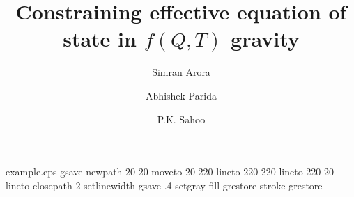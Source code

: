 %
%
%
%
%
\begin{filecontents*}{example.eps}
gsave
newpath
  20 20 moveto
  20 220 lineto
  220 220 lineto
  220 20 lineto
closepath
2 setlinewidth
gsave
  .4 setgray fill
grestore
stroke
grestore
\end{filecontents*}
%
\RequirePackage{fix-cm}
\documentclass[twocolumn,epjc3]{svjour3}  
%
\smartqed  %
%
\RequirePackage{graphicx}
\RequirePackage{float}
\RequirePackage{hyperref}
\RequirePackage{amsmath}
\usepackage{mwe}
\RequirePackage{amssymb}
\RequirePackage{mathtools}   
\usepackage{orcidlink}
\usepackage{booktabs}
\usepackage{caption}
\usepackage{multirow}
\usepackage{dcolumn}
\usepackage[caption=false]{subfig}
\usepackage{float}   %
%
%
%
%


\title{Constraining effective equation of state in $f(Q,T)$ gravity}


\author{Simran Arora
        \and
        Abhishek Parida
        \and
        P.K. Sahoo}
        

